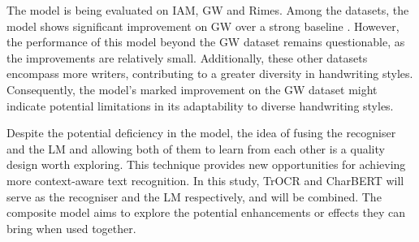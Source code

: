 The model is being evaluated on IAM, GW and Rimes. Among the datasets, the model shows significant improvement on GW over a strong baseline \citep{8395102}. However, the performance of this model beyond the GW dataset remains questionable, as the improvements are relatively small. Additionally, these other datasets encompass more writers, contributing to a greater diversity in handwriting styles. Consequently, the model's marked improvement on the GW dataset might indicate potential limitations in its adaptability to diverse handwriting styles.

Despite the potential deficiency in the model, the idea of fusing the recogniser and the LM and allowing both of them to learn from each other is a quality design worth exploring. This technique provides new opportunities for achieving more context-aware text recognition. In this study, TrOCR and CharBERT will serve as the recogniser and the LM respectively, and will be combined. The composite model aims to explore the potential enhancements or effects they can bring when used together.
